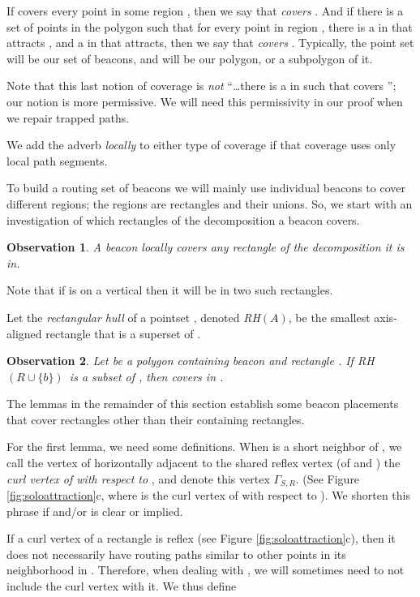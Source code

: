 \documentclass{article}
\newtheorem{obs}{Observation}
\newcommand{\curl}[2]{\ensuremath{\Gamma_{#1, #2}}}
\newcommand{\RH}[1]{\textsl{RH}\ensuremath{(#1)}}
\begin{document}
		If  covers every point in some
		region , then we say that  \emph{covers} .
		And if there is a set of points  in the polygon such that for every point
		 in region , there is a  in  that attracts , and a  in 
		that  attracts, then we say that  \emph{covers} .
		Typically, the point set  will be our set of beacons, and  will be our
		polygon, or a subpolygon of it.  
		
		Note that this last notion of coverage is \emph{not} ``\ldots there is a 
		in  such that  covers ''; our notion is more permissive.  We will
		need this permissivity in our proof when we repair trapped paths.
		
		We add the adverb \emph{locally} to
		either type of coverage if that coverage uses only local path
		segments.
		
		To build a routing set of beacons we will mainly use individual beacons to
		cover different regions; the regions are rectangles and their unions.
		So, we start with an investigation of which rectangles of
		the decomposition a beacon covers.
		
		\begin{obs}\label{obs:contained}
		A beacon  locally covers any rectangle of the decomposition it is in.
		\end{obs}
		Note that if  is on a vertical then it will be in two such rectangles.
		
		Let the \emph{rectangular hull} of a pointset , denoted \RH{A}, be the
		smallest axis-aligned rectangle that is a superset of .

		\begin{obs}\label{obs:hullcontained}
		Let  be a polygon containing beacon  and rectangle .
		If \RH{R \cup \{b\}}\  is a subset of ,
		then  covers  in . 
		\end{obs}
		
		The lemmas in the remainder of this section establish some beacon placements
		that cover rectangles other than their containing rectangles. 
		
		For the first lemma, we need some definitions. When  is a short neighbor of
		, we call the vertex of  horizontally adjacent to the shared reflex vertex (of
		 and ) the \emph{curl vertex of  with respect to }, and denote this
		vertex \curl{S}{R}. 
		(See Figure \ref{fig:soloattraction}c, where  is the curl vertex of  with respect to
		).
		We shorten this phrase if  and/or  is clear or implied.
		
		If a curl vertex of a rectangle is reflex (see Figure \ref{fig:soloattraction}c),
		then it does not necessarily have routing paths similar to other points in
		its neighborhood in .
		Therefore, when dealing with , we will sometimes need to not include the
		curl vertex with it.  We thus define
		
\end{document}
